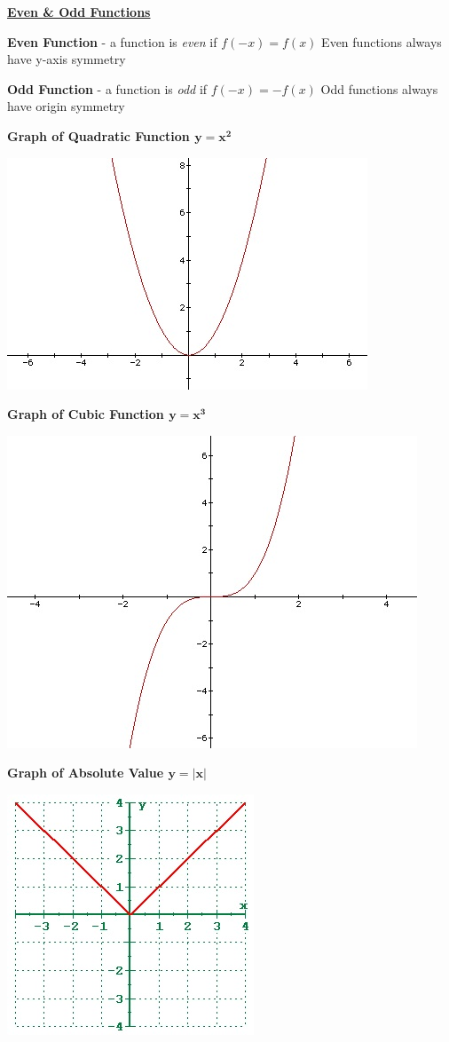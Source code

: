 \documentclass[12pt]{article}
\newenvironment{myindentpar}[1]%
     {\begin{list}{}%
             {\setlength{\leftmargin}{#1}}%
             \item[]%
     }
     {\end{list}}
\begin{document}
{\bf \underline{Even \& Odd Functions}}
\begin{myindentpar}{1cm}
\textbf{Even Function} - a function is \textit{even} if $f(-x) = f(x)$ Even functions always have y-axis symmetry

\textbf{Odd Function} - a function is \textit{odd} if $f(-x) = -f(x)$ Odd functions always have origin symmetry
\end{myindentpar}

\textbf{Graph of Quadratic Function $\mathbf{y=x^2}$}

\includegraphics{Quadratic.jpg}

\newpage

\textbf{Graph of Cubic Function $\mathbf{y=x^3}$}

\includegraphics[scale = 0.9]{CubeFunction.jpg}

\textbf{Graph of Absolute Value $\mathbf{y=|x|}$}

\includegraphics[scale = 0.9]{AbsoluteValue.jpg}
\end{document}
